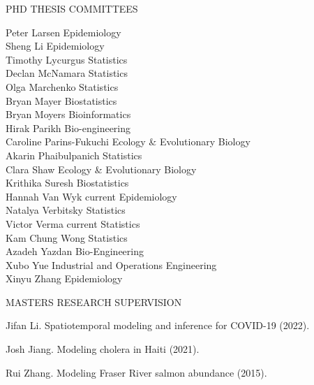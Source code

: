 \begin{mylist}{PHD THESIS COMMITTEES}
\begin{tabbing}
Peter Larsen  \> Epidemiology\\
Sheng Li  \>Epidemiology\\
Timothy Lycurgus  \> Statistics\\
Declan McNamara  \> Statistics\\
Olga Marchenko  \> Statistics\\
Bryan Mayer  \> Biostatistics\\
Bryan Moyers \> Bioinformatics\\
Hirak Parikh  \> Bio-engineering\\
Caroline Parins-Fukuchi  \> Ecology \& Evolutionary Biology\\
Akarin Phaibulpanich  \> Statistics\\
Clara Shaw \> Ecology \& Evolutionary Biology\\
Krithika Suresh  \> Biostatistics\\
Hannah Van Wyk \> current \> Epidemiology\\
Natalya Verbitsky  \> Statistics\\
Victor Verma \> current \> Statistics\\
Kam Chung Wong  \> Statistics\\
Azadeh Yazdan  \> Bio-Engineering\\
Xubo Yue  \> Industrial and Operations Engineering\\
Xinyu Zhang  \> Epidemiology \\
\end{tabbing}

\end{mylist}

\lsp

\begin{reflist}{MASTERS RESEARCH SUPERVISION}
\item{Jifan Li}. Spatiotemporal modeling and inference for COVID-19 (2022).
\item{Josh Jiang}. Modeling cholera in Haiti (2021).
\item{Rui Zhang}. Modeling Fraser River salmon abundance (2015).
\end{reflist}

